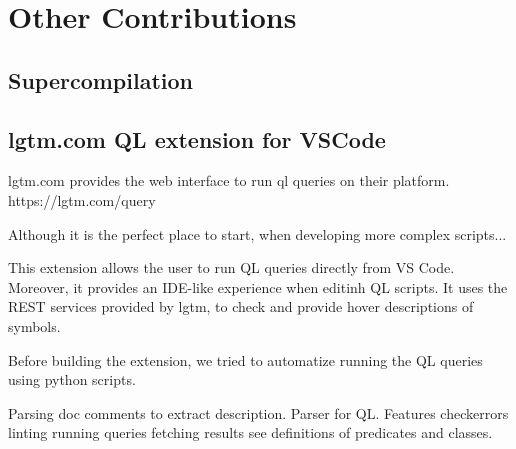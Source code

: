 
\chapter{Other Contributions}



\section{Supercompilation}

\section{lgtm.com QL extension for VSCode}

lgtm.com provides the web interface to run ql queries on their platform.
https://lgtm.com/query

Although it is the perfect place to start, when developing more complex scripts...

This extension allows the user to run QL queries directly from VS Code.
Moreover, it provides an IDE-like experience when editinh QL scripts.
It uses the REST services provided by lgtm, to check and provide hover descriptions of symbols.

Before building the extension, we tried to automatize running the QL queries using python
scripts.

Parsing doc comments to extract description.
Parser for QL.
Features
checkerrors linting
running queries
fetching results
see definitions of predicates and classes.